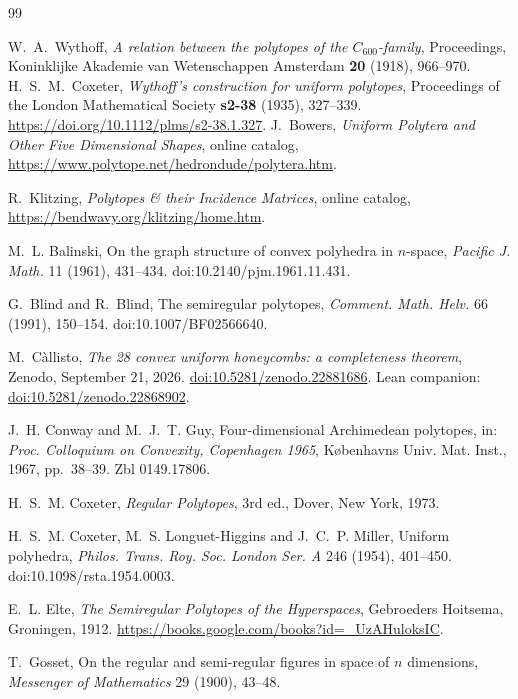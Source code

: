\documentclass[11pt]{article}
\theoremstyle{definition}
\theoremstyle{remark}
\begin{document}
\begin{thebibliography}{99}

W.~A.~Wythoff, \emph{A relation between the polytopes of the
$C_{600}$-family}, Proceedings, Koninklijke Akademie van Wetenschappen
Amsterdam \textbf{20} (1918), 966--970.
H.~S.~M.~Coxeter, \emph{Wythoff's construction for uniform polytopes},
Proceedings of the London Mathematical Society \textbf{s2-38} (1935),
327--339. \url{https://doi.org/10.1112/plms/s2-38.1.327}.
J.~Bowers, \emph{Uniform Polytera and Other Five Dimensional Shapes}, online catalog,
\url{https://www.polytope.net/hedrondude/polytera.htm}.

R.~Klitzing, \emph{Polytopes \& their Incidence Matrices}, online catalog,
\url{https://bendwavy.org/klitzing/home.htm}.

M.~L. Balinski, On the graph structure of convex polyhedra in $n$-space,
\emph{Pacific J. Math.} 11 (1961), 431--434.
doi:10.2140/pjm.1961.11.431.

G.~Blind and R.~Blind, The semiregular polytopes, \emph{Comment. Math.
Helv.} 66 (1991), 150--154. doi:10.1007/BF02566640.

M.~Càllisto, \emph{The 28 convex uniform honeycombs: a completeness
theorem}, Zenodo, September 21, 2026.
\href{https://doi.org/10.5281/zenodo.22881686}{doi:10.5281/zenodo.22881686}.
Lean companion:
\href{https://doi.org/10.5281/zenodo.22868902}{doi:10.5281/zenodo.22868902}.

J.~H. Conway and M.~J.~T. Guy, Four-dimensional Archimedean polytopes,
in: \emph{Proc. Colloquium on Convexity, Copenhagen 1965},
Københavns Univ. Mat. Inst., 1967, pp.~38--39. Zbl 0149.17806.

H.~S.~M. Coxeter, \emph{Regular Polytopes}, 3rd ed., Dover, New York, 1973.

H.~S.~M. Coxeter, M.~S. Longuet-Higgins and J.~C.~P. Miller, Uniform
polyhedra, \emph{Philos. Trans. Roy. Soc. London Ser. A} 246 (1954),
401--450. doi:10.1098/rsta.1954.0003.

E.~L. Elte, \emph{The Semiregular Polytopes of the Hyperspaces},
Gebroeders Hoitsema, Groningen, 1912.
\url{https://books.google.com/books?id=_UzAHuloksIC}.

T.~Gosset, On the regular and semi-regular figures in space of $n$
dimensions, \emph{Messenger of Mathematics} 29 (1900), 43--48.


\end{thebibliography}
\end{document}
